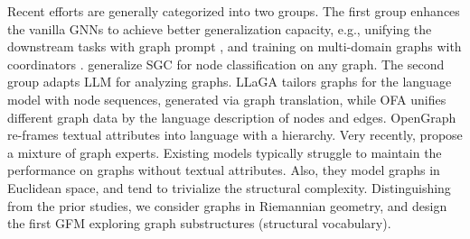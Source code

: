 
Recent efforts are generally categorized into two groups.
The first group enhances the vanilla GNNs to achieve better generalization capacity, e.g., unifying the downstream tasks with graph prompt \cite{kdd23all-in-one}, and training on multi-domain graphs with coordinators \cite{kdd24gcope}.
\citet{zhao2024graphany} generalize SGC \cite{icml19sgc} for node classification on any graph.
The second group adapts LLM for analyzing graphs.
LLaGA \cite{icml24llaga} tailors graphs for the language model with node sequences, generated via graph translation,
while OFA \cite{iclr24ofa}  unifies different graph data by the language description of nodes and edges.
OpenGraph \cite{xia2024opengraph} re-frames textual attributes into language with a hierarchy.
Very recently, \citet{xia2024anygraph} propose a mixture of graph experts.
Existing models  typically struggle to maintain the performance on graphs without textual attributes.
Also, they model graphs in Euclidean space, and tend to trivialize the structural complexity.
Distinguishing from the prior studies, we consider graphs in Riemannian geometry, and design the first GFM exploring graph substructures (structural vocabulary).



